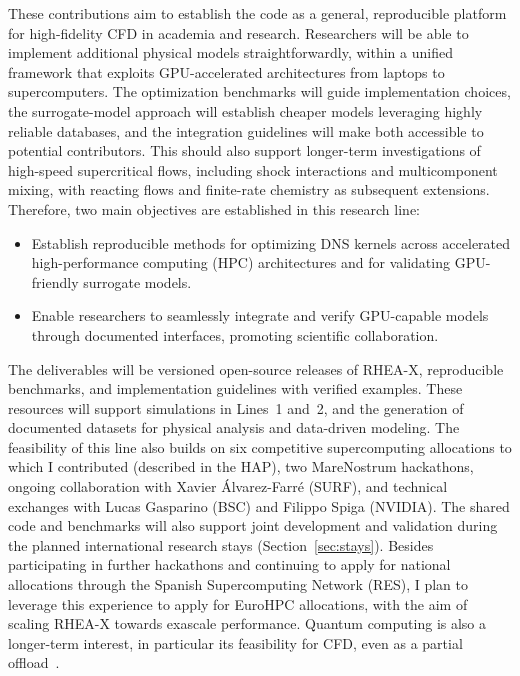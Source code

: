 \documentclass[11pt]{article}
\newcommand{\NEW}[1]{\iffinal #1\else{\color{red}#1}\fi}
\begin{document}
These contributions aim to establish the code as a general, reproducible platform for high-fidelity CFD in academia and research. Researchers will be able to implement additional physical models straightforwardly, within a unified framework that exploits GPU-accelerated architectures from laptops to supercomputers.
The optimization benchmarks will guide implementation choices, the surrogate-model approach will establish cheaper models leveraging highly reliable databases, and the integration guidelines will make both accessible to potential contributors. 
This should also support longer-term investigations of high-speed supercritical flows, including shock interactions and multicomponent mixing, with reacting flows and finite-rate chemistry as subsequent extensions.
Therefore, two main objectives are established in this research line:
\begin{itemize}
	\item[\textbf{O7.}] Establish reproducible methods for optimizing DNS kernels across accelerated \NEW{high-performance computing (HPC)} architectures and for validating GPU-friendly surrogate models.
	\item[\textbf{O8.}] Enable researchers to seamlessly integrate and verify GPU-capable models through documented interfaces, promoting scientific collaboration.
\end{itemize}

The deliverables will be versioned open-source releases of RHEA-X, reproducible benchmarks, and implementation guidelines with verified examples. 
These resources will support simulations in Lines~1 and~2, and the generation of documented datasets for physical analysis and data-driven modeling. 
The feasibility of this line also builds on six competitive supercomputing allocations to which I contributed (described in the HAP), two MareNostrum hackathons, ongoing collaboration with Xavier Álvarez-Farré (SURF), and technical exchanges with Lucas Gasparino (BSC) and Filippo Spiga (NVIDIA). 
The shared code and benchmarks will also support joint development and validation during the planned international research stays (Section~\ref{sec:stays}).
Besides participating in further hackathons and continuing to apply for national allocations through the Spanish Supercomputing Network (RES), I plan to leverage this experience to apply for EuroHPC allocations, with the aim of scaling RHEA-X towards exascale performance.
Quantum computing is also a longer-term interest, in particular its feasibility for CFD, even as a partial offload~\cite{Bharadwaj2023}.
\end{document}

